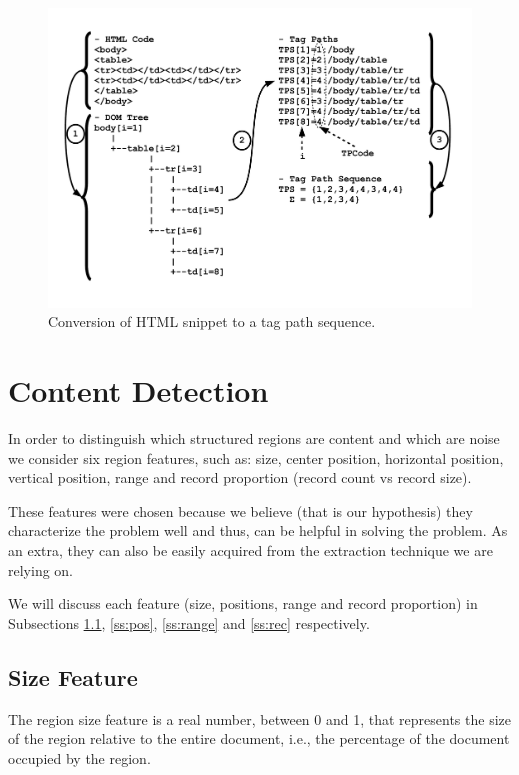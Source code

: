 \begin{figure}[h]
  \centering
     \includegraphics[trim={1.0cm 2.0cm 1.5cm 1.0cm}, clip, 
     width=1.0\columnwidth]{img/tree2seq.pdf}
  \caption{Conversion of HTML snippet to a tag path sequence.}
  \label{fig:tree2seq}
\end{figure}

\section{Content Detection}\label{sec:content}
In order to distinguish which structured regions are content and which are noise
we consider six region features, such as: size, center position, horizontal
position, vertical position, range and record proportion (record count vs
record size).

These features were chosen because we believe (that is our hypothesis) they
characterize the problem well and thus, can be helpful in solving the problem.
As an extra, they can also be easily acquired from the extraction technique we
are relying on.

We will discuss each feature (size, positions, range and record proportion) in
Subsections \ref{ss:size}, \ref{ss:pos}, \ref{ss:range} and \ref{ss:rec}
respectively.

\subsection{Size Feature}\label{ss:size}
The region size feature is a real number, between 0 and 1, that represents the
size of the region relative to the entire document, i.e., the percentage of the
document occupied by the region.

